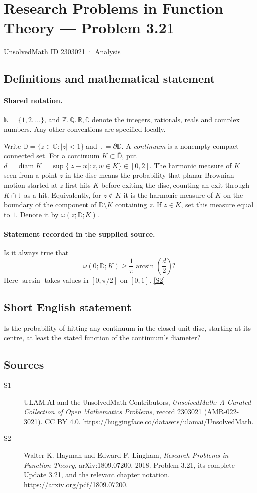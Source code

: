\documentclass[11pt]{book}
\newcommand{\sref}[2]{\hyperlink{source:#1:#2}{[S#2]}}
\begin{document}
\setcounter{section}{2303020}
\section{Research Problems in Function Theory — Problem 3.21}\label{2303021}
{\small\sffamily UnsolvedMath ID 2303021 · Analysis}
\subsection{Definitions and mathematical statement}

\paragraph{Shared notation.}$\mathbb N=\{1,2,\ldots\}$, and $\mathbb Z,\mathbb Q,\mathbb R,\mathbb C$ denote the integers, rationals, reals and complex numbers. Any other conventions are specified locally.


Write $\mathbb D=\{z\in\mathbb C:|z|<1\}$ and $\mathbb T=\partial\mathbb D$. A \emph{continuum} is a nonempty compact connected set. For a continuum $K\subset\overline{\mathbb D}$, put $d=\operatorname{diam}K=\sup\{|z-w|:z,w\in K\}\in[0,2]$. The harmonic measure of $K$ seen from a point $z$ in the disc means the probability that planar Brownian motion started at $z$ first hits $K$ before exiting the disc, counting an exit through $K\cap\mathbb T$ as a hit. Equivalently, for $z\notin K$ it is the harmonic measure of $K$ on the boundary of the component of $\mathbb D\setminus K$ containing $z$. If $z\in K$, set this measure equal to $1$. Denote it by $\omega(z;\mathbb D;K)$.
\paragraph{Statement recorded in the supplied source.}
Is it always true that
\[\omega(0;\mathbb D;K)\ge\frac1\pi\arcsin\!\left(\frac d2\right)?\]
Here $\arcsin$ takes values in $[0,\pi/2]$ on $[0,1]$. \sref{2303021}{2}
\subsection{Short English statement}
Is the probability of hitting any continuum in the closed unit disc, starting at its centre, at least the stated function of the continuum’s diameter?
\subsection{Sources}
\begin{description}
\item[\hypertarget{source:2303021:1}{S1}] ULAM.AI and the UnsolvedMath Contributors, \emph{UnsolvedMath: A Curated Collection of Open Mathematics Problems}, record 2303021 (AMR-022-3021). CC BY 4.0. \url{https://huggingface.co/datasets/ulamai/UnsolvedMath}.
\item[\hypertarget{source:2303021:2}{S2}] Walter K. Hayman and Edward F. Lingham, \emph{Research Problems in Function Theory}, arXiv:1809.07200, 2018. Problem 3.21, its complete Update 3.21, and the relevant chapter notation. \url{https://arxiv.org/pdf/1809.07200}.
\end{description}
\label{end:2303021}
\end{document}
